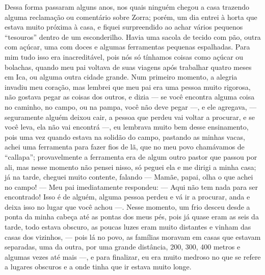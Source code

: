 Dessa forma passaram alguns anos, nos quais ninguém chegou a casa trazendo alguma reclamação ou comentário sobre Zorra; porém, um dia entrei à horta que estava muito próxima à casa, e fiquei surpreendido ao achar vários pequenos ``tesouros'' dentro de um esconderilho. Havia uma sacola de tecido com pão, outra com açúcar, uma com doces e algumas ferramentas pequenas espalhadas. 
Para mim tudo isso era inacreditável, pois nós só tínhamos coisas como açúcar ou bolachas, quando meu pai voltava de suas viagens após trabalhar quatro meses em Ica, ou alguma outra cidade grande.
Num primeiro momento, a alegria invadiu meu coração, mas lembrei que meu pai era uma pessoa muito rigorosa, não gostava pegar as coisas dos outros, e dizia --- se você encontra alguma coisa no caminho, no campo, ou na pampa, você não deve pegar ---, e ele agregava, --- seguramente alguém deixou cair, a pessoa que perdeu vai voltar a procurar, e se você leva, ela não vai encontrá ---, 
eu lembrava muito bem desse ensinamento, pois uma vez quando estava na solidão do campo, pastando as minhas vacas, achei uma ferramenta para fazer fios de lã, que no meu povo chamávamos de ``callapa''; provavelmente a ferramenta era de algum outro pastor que passou por ali, mas nesse momento não pensei nisso, só peguei ela e me dirigi a minha casa; já na tarde, cheguei  muito contente, falando --- Mamãe, papai, olha o que achei no campo! --- 
Meu pai imediatamente respondeu: --- Aqui não tem nada para ser encontrado! Isso é de alguém, alguma pessoa perdeu e vá ir a procurar, anda e deixa isso no lugar que você achou ---. 
Nesse momento, um frio desceu desde a ponta da minha cabeça até as pontas dos meus pés, pois já quase eram as seis da tarde, todo estava obscuro, as poucas luzes eram muito distantes e vinham das casas dos vizinhos, --- pois lá no povo, as famílias moravam em casas que estavam separadas, uma da outra, por uma grande distância, 200, 300, 400 metros e algumas vezes até mais  ---, e para finalizar, eu era muito medroso no que se refere a lugares obscuros e a onde tinha que ir estava muito longe.

